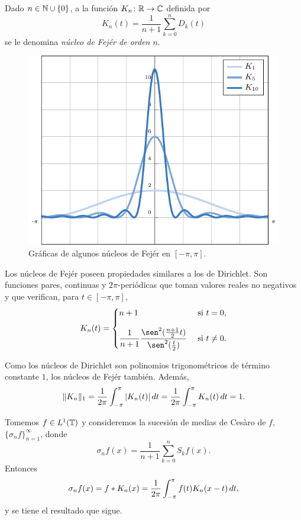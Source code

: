 \documentclass[a4paper, 12pt]{book}
\begin{document}
\begin{definition}\label{1.2.5}
    Dado $n \in \mathbb N \cup \{0\}$, a la función $K_n \colon \mathbb R \to \mathbb C$ definida por
    \[K_n(t) = \frac{1}{n+1}\sum_{k=0}^n D_k(t)\]
    se le denomina \emph{núcleo de Fejér de orden $n$}.
\end{definition}

\begin{figure}[H]
    \centering
    \includegraphics{./plot14/main.pdf}
  \caption{Gráficas de algunos núcleos de Fejér en $[-\pi,\pi]$.}
\end{figure}

Los núcleos de Fejér poseen propiedades similares a los de Dirichlet. Son funciones pares, continuas y $2\pi$-periódicas que toman valores reales no negativos y que verifican, para $t \in [-\pi,\pi]$,
\[K_n(t) = \begin{cases}
    n+1 & $ si $ t = 0, \\[10pt]
    \displaystyle\frac{1}{n+1}\frac{\sen^2(\frac{n+1}{2}t)}{\sen^2(\frac{t}{2})} & $ si $ t \neq 0. 
\end{cases}\]

Como los núcleos de Dirichlet son polinomios trigonométricos de término constante $1$, los núcleos de Fejér también. Además,
\[\|K_n\|_1 = \frac{1}{2\pi}\int_{-\pi}^{\pi} |K_n(t)| \, dt =  \frac{1}{2\pi}\int_{-\pi}^{\pi} K_n(t) \, dt = 1.\]

Tomemos $f \in L^1(\mathbb T)$ y consideremos la sucesión de medias de Cesàro de $f$, $\{\sigma_nf\}_{n=1}^\infty$, donde
\[\sigma_nf(x) = \frac{1}{n+1}\sum_{k=0}^nS_kf(x).\]
Entonces
\[\sigma_nf(x) = f \ast K_n(x) = \frac{1}{2\pi}\int_{-\pi}^{\pi} f(t)K_n(x-t) \, dt,\]
y se tiene el resultado que sigue.
\end{document}
